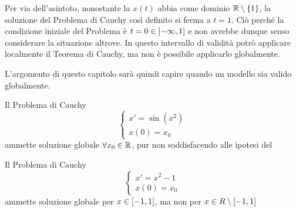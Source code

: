\begin{example}
\begin{center}
\begin{tikzpicture}[baseline]
		\end{tikzpicture}
	\end{center}
	Per via dell'asintoto, nonostante la $x(t)$ abbia come dominio $\R \setminus \brackets{1}$, la soluzione del Problema di Cauchy così definito si ferma a $t=1$. Ciò perché la condizione iniziale del Problema è $t = 0 \in \intervalopcl{-\infty}{1}$ e non avrebbe dunque senso considerare la situazione altrove. In questo intervallo di validità potrò applicare localmente il Teorema di Cauchy, ma non è possibile applicarlo globalmente.
	\begin{note}
		L'argomento di questo capitolo sarà quindi capire quando un modello sia valido globalmente.
	\end{note}
\end{example}
\begin{example}
	Il Problema di Cauchy
	\begin{equation}
		\begin{cases}
			x' = \sin(x^2)\\
			x(0) = x_0
		\end{cases}
	\end{equation}
	ammette soluzione globale $\forall x_0 \in \R$, pur non soddisfacendo alle ipotesi del 
\end{example}
\begin{example}
	Il Problema di Cauchy
	\begin{equation}
		\begin{cases}
			x' = x^2 - 1\\
			x(0) = x_0
		\end{cases}
	\end{equation}
	ammette soluzione globale per $x \in \intervalclose{-1}{1}$, ma non per $x \in R \setminus \intervalclose{-1}{1}$
\end{example}

\cbstart
